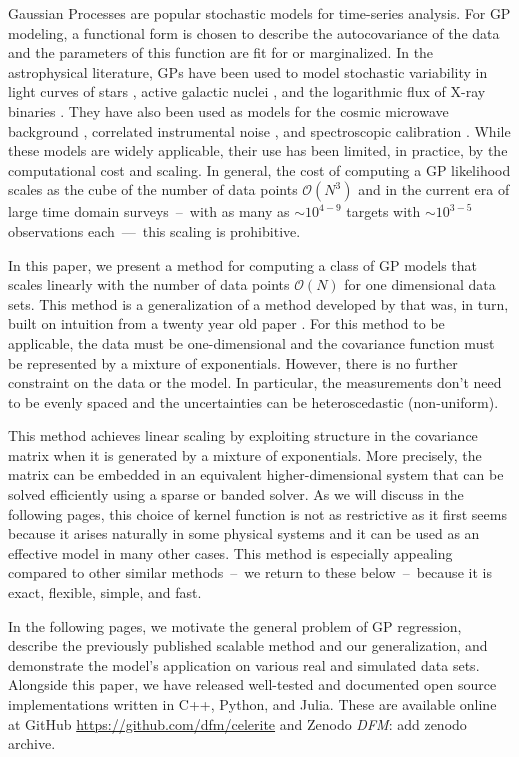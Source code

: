 \documentclass[manuscript, letterpaper]{aastex6}
\newcommand{\project}[1]{\textsf{#1}}
\newcommand{\todo}[3]{{\color{#2}\emph{#1}: #3}}
\newcommand{\dfmtodo}[1]{\todo{DFM}{red}{#1}}
\begin{document}
Gaussian Processes \citep[GPs;][]{Rasmussen:2006} are popular stochastic
models for time-series analysis.
For GP modeling, a functional form is chosen to describe the autocovariance
of the data and the parameters of this function are fit for or marginalized.
In the astrophysical literature, GPs have been used to model stochastic
variability in light curves of stars \citep{Brewer:2009}, active galactic
nuclei \citep{Kelly:2014}, and the logarithmic flux of X-ray binaries
\citep{Uttley:2005}.
They have also been used as models for the cosmic microwave background
\citep{Bond:1987, Bond:1999, Wandelt:2003}, correlated instrumental noise
\citep{Gibson:2012}, and spectroscopic calibration \citep{Czekala:2017,
Evans:2015}.
While these models are widely applicable, their use has been limited, in
practice, by the computational cost and scaling.
In general, the cost of computing a GP likelihood scales as the cube of
the number of data points $\mathcal{O}(N^3)$ and in the current era of large
time domain surveys~--~with as many as $\sim10^{4-9}$ targets with
$\sim10^{3-5}$ observations each~---~this scaling is prohibitive.

In this paper, we present a method for computing a class of GP models that
scales linearly with the number of data points $\mathcal{O}(N)$ for one
dimensional data sets.
This method is a generalization of a method developed by
\citet{Ambikasaran:2015} that was, in turn, built on intuition from a twenty
year old paper \citep{Rybicki:1995}.
For this method to be applicable, the data must be one-dimensional and the
covariance function must be represented by a mixture of exponentials.
However, there is no further constraint on the data or the model.
In particular, the measurements don't need to be evenly spaced and the
uncertainties can be heteroscedastic (non-uniform).

This method achieves linear scaling by exploiting structure in the covariance
matrix when it is generated by a mixture of exponentials.
More precisely, the matrix can be embedded in an equivalent higher-dimensional
system that can be solved efficiently using a sparse or banded solver.
As we will discuss in the following pages, this choice of kernel function is
not as restrictive as it first seems because it arises naturally in some
physical systems and it can be used as an effective model in many other cases.
This method is especially appealing compared to other similar methods~--~we
return to these below~--~because it is exact, flexible, simple, and fast.

In the following pages, we motivate the general problem of GP regression,
describe the previously published scalable method \citep{Rybicki:1995,
Ambikasaran:2015} and our generalization, and demonstrate the model's
application on various real and simulated data sets.
Alongside this paper, we have released well-tested and documented open source
implementations written in \project{C++}, \project{Python}, and
\project{Julia}.
These are available online at \project{GitHub}
\url{https://github.com/dfm/celerite} and \project{Zenodo} \dfmtodo{add zenodo
archive}.
\end{document}
